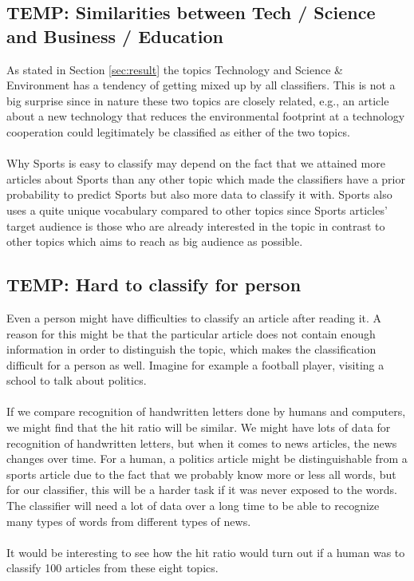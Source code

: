 \subsection{TEMP: Similarities between Tech / Science and Business / Education} %
\label{sub:temp_similarities_between_tech_science_and_business_education}
As stated in Section \ref{sec:result} the topics Technology and Science \& Environment has a tendency of getting mixed up by all classifiers. This is not a big surprise since in nature these two topics are closely related, e.g., an article about a new technology that reduces the environmental footprint at a technology cooperation could legitimately be classified as either of the two topics.\\\\
Why Sports is easy to classify may depend on the fact that we attained more articles about Sports than any other topic which made the classifiers have a prior probability to predict Sports but also more data to classify it with. Sports also uses a quite unique vocabulary compared to other topics since Sports articles' target audience is those who are already interested in the topic in contrast to other topics which aims to reach as big audience as possible.

\subsection{TEMP: Hard to classify for person} %
\label{sub:temp_hard_to_classify_for_person}
Even a person might have difficulties to classify an article after reading it. A reason for this might be that the particular article does not contain enough information in order to distinguish the topic, which makes the classification difficult for a person as well. Imagine for example a football player, visiting a school to talk about politics.
\\\\
If we compare recognition of handwritten letters done by humans and computers, we might find that the hit ratio will be similar. We might have lots of data for recognition of handwritten letters, but when it comes to news articles, the news changes over time. For a human, a politics article might be distinguishable from a sports article due to the fact that we probably know more or less all words, but for our classifier, this will be a harder task if it was never exposed to the words. The classifier will need a lot of data over a long time to be able to recognize many types of words from different types of news.
\\\\
It would be interesting to see how the hit ratio would turn out if a human was to classify 100 articles from these eight topics. 


